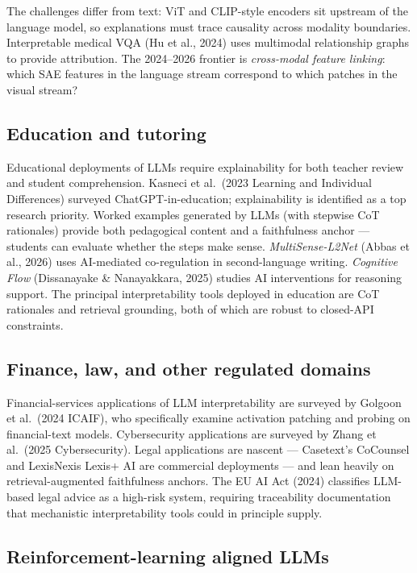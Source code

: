 The challenges differ from text: ViT and CLIP-style encoders sit upstream of the language model, so explanations must trace causality across modality boundaries. Interpretable medical VQA (Hu et al., 2024) uses multimodal relationship graphs to provide attribution. The 2024--2026 frontier is \emph{cross-modal feature linking}: which SAE features in the language stream correspond to which patches in the visual stream?

\subsection{Education and tutoring}\label{education-and-tutoring}

Educational deployments of LLMs require explainability for both teacher review and student comprehension. Kasneci et al.~(2023 Learning and Individual Differences) surveyed ChatGPT-in-education; explainability is identified as a top research priority. Worked examples generated by LLMs (with stepwise CoT rationales) provide both pedagogical content and a faithfulness anchor --- students can evaluate whether the steps make sense. \emph{MultiSense-L2Net} (Abbas et al., 2026) uses AI-mediated co-regulation in second-language writing. \emph{Cognitive Flow} (Dissanayake \& Nanayakkara, 2025) studies AI interventions for reasoning support. The principal interpretability tools deployed in education are CoT rationales and retrieval grounding, both of which are robust to closed-API constraints.

\subsection{Finance, law, and other regulated domains}\label{finance-law-and-other-regulated-domains}

Financial-services applications of LLM interpretability are surveyed by Golgoon et al.~(2024 ICAIF), who specifically examine activation patching and probing on financial-text models. Cybersecurity applications are surveyed by Zhang et al.~(2025 Cybersecurity). Legal applications are nascent --- Casetext's CoCounsel and LexisNexis Lexis+ AI are commercial deployments --- and lean heavily on retrieval-augmented faithfulness anchors. The EU AI Act (2024) classifies LLM-based legal advice as a high-risk system, requiring traceability documentation that mechanistic interpretability tools could in principle supply.

\subsection{Reinforcement-learning aligned LLMs}\label{reinforcement-learning-aligned-llms}


